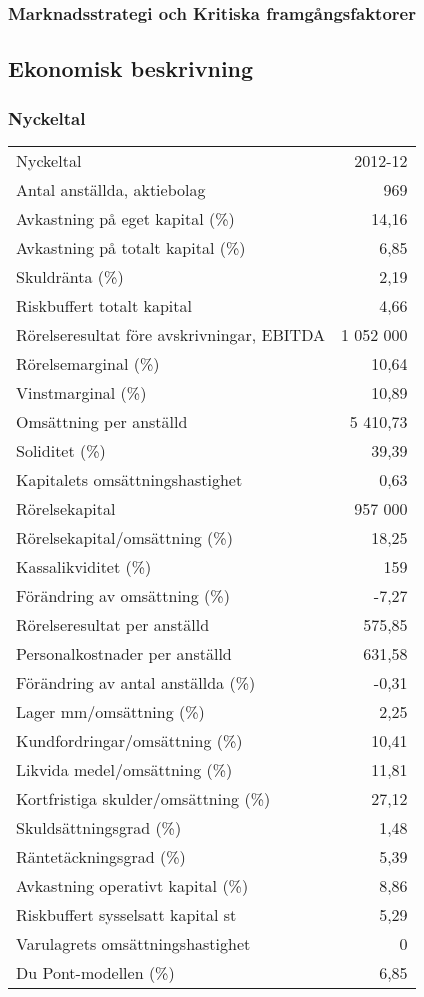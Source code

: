 \documentclass[10pt,a4paper]{article}
\begin{document}
\subsubsection{Marknadsstrategi och Kritiska framgångsfaktorer}

\subsection{Ekonomisk beskrivning}


\subsubsection{Nyckeltal}
\begin{tabular}{ l r }
	Nyckeltal & 2012-12\\
	Antal anställda, aktiebolag & 969\\
	Avkastning på eget kapital (\%) & 14,16\\
	Avkastning på totalt kapital (\%) & 6,85\\
	Skuldränta (\%) & 2,19\\
	Riskbuffert totalt kapital & 4,66\\
	Rörelseresultat före avskrivningar, EBITDA & 1 052 000\\
	Rörelsemarginal (\%) & 10,64\\
	Vinstmarginal (\%) & 10,89\\
	Omsättning per anställd & 5 410,73\\
	Soliditet (\%) & 39,39\\
	Kapitalets omsättningshastighet & 0,63\\
	Rörelsekapital & 957 000\\
	Rörelsekapital/omsättning (\%) & 18,25\\
	Kassalikviditet (\%) & 159\\
	Förändring av omsättning (\%) & -7,27\\
	Rörelseresultat per anställd & 575,85\\
	Personalkostnader per anställd & 631,58\\
	Förändring av antal anställda (\%) & -0,31\\
	Lager mm/omsättning (\%) & 2,25\\
	Kundfordringar/omsättning (\%) & 10,41\\
	Likvida medel/omsättning (\%) & 11,81\\
	Kortfristiga skulder/omsättning (\%) & 27,12\\
	Skuldsättningsgrad (\%) & 1,48\\
	Räntetäckningsgrad (\%) & 5,39\\
	Avkastning operativt kapital (\%) & 8,86\\
	Riskbuffert sysselsatt kapital st & 5,29\\
	Varulagrets omsättningshastighet & 0\\
	Du Pont-modellen (\%) & 6,85\\
\end{tabular}
\end{document}
